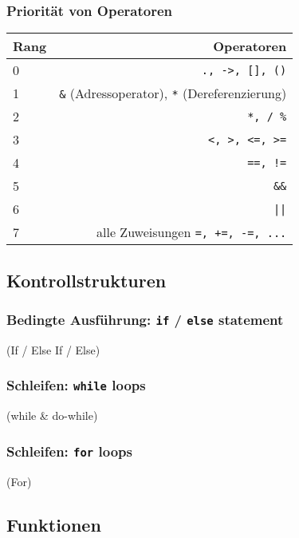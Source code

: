 \subsubsection{Priorität von Operatoren}
\begin{table}[H]
  \centering
  \begin{tabular}{l r}
    \hline
    Rang & Operatoren \\
    \hline
    0 & \texttt{., ->, [], ()}\\
    1 & \texttt{\&} (Adressoperator), \texttt{*} (Dereferenzierung)\\
    2 & \texttt{*, / \%}\\
    3 & \texttt{<, >, <=, >=}\\
    4 & \texttt{==, !=}\\
    5 & \texttt{\&\&}\\
    6 & \texttt{||}\\
    7 & alle Zuweisungen \texttt{=, +=, -=, ...}\\
    \hline
  \end{tabular}
\end{table}

\subsection{Kontrollstrukturen}
\iflecturer
\begin{framed}
\end{framed}
\fi

\subsubsection{Bedingte Ausführung: \texttt{if} / \texttt{else} statement}

\iflecturer
\begin{framed}
  \slide{} (If / Else If / Else)
\end{framed}
\fi


\subsubsection{Schleifen: \texttt{while} loops}

\iflecturer
\begin{framed}
   (while \& do-while)
\end{framed}
\fi

\subsubsection{Schleifen: \texttt{for} loops}

\iflecturer
\begin{framed}
   (For)
\end{framed}
\fi

\subsection{Funktionen}
\iflecturer
\begin{framed}
\end{framed}
\fi

